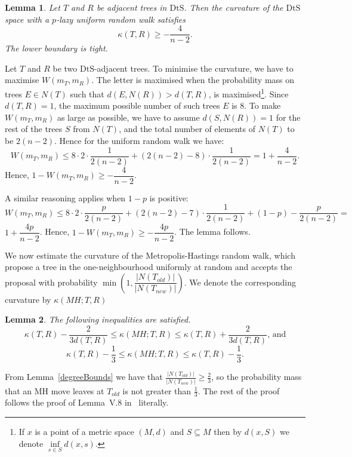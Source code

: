 \documentclass{amsart}
\newtheorem{lemma}{Lemma}
\newcommand{\dts}{\mathrm{DtS}}
\begin{document}
\begin{lemma}\label{uniformLower}
Let $T$ and $R$ be adjacent trees in $\dts$. Then the curvature of the $\dts$
space with a $p$-lazy uniform random walk satisfies
\[
\kappa(T,R) \geq -\frac{4}{n-2}.
\]
The lower boundary is tight. 
\end{lemma}

\proof
Let $T$ and $R$ be two $\dts$-adjacent trees. To minimise the curvature, we have
to maximise $W(m_T, m_R)$. The letter is maximised when the probability mass
on trees $E\in N(T)$ such that $d(E, N(R)) > d(T, R)$, is 
maximised\footnote{If $x$ is a point of a metric space $(M,d)$ and 
$S \subseteq M$ then by $d(x,S)$ we denote $\inf\limits_{s \in S} d(x,s)$.}. 
Since $d(T, R) = 1$, the maximum possible number of such trees $E$ is 
$8$. To make $W(m_T,m_R)$ as large as possible, we have to assume 
$d(S, N(R)) = 1$ for the rest of the trees $S$ from $N(T)$, and the
total number of elements of $N(T)$ to be $2(n-2)$.
Hence for the uniform random walk we have: 
\[
W(m_T,m_R)\leq 8 \cdot 2 \cdot \frac{1}{2(n - 2)} +
(2(n - 2) - 8) \cdot \frac{1}{2(n-2)} = 1 + \dfrac{4}{n-2}.
\]
Hence, $1 - W(m_T,m_R) \geq - \dfrac{4}{n-2}$. 

A similar reasoning applies when $1-p$ is positive:
\[
W(m_T,m_R)\leq 8 \cdot 2 \cdot \frac{p}{2(n - 2)} + 
(2(n - 2) - 7) \cdot \frac{1}{2(n-2)} + (1-p) - \frac{p}{2(n-2)} =
\]
$1 + \dfrac{4p}{n-2}$. Hence, 
$1 - W(m_T,m_R) \geq - \dfrac{4p}{n-2}$. The lemma follows. 
\endproof

We now estimate the curvature of the Metropolis-Hastings random walk, which 
propose a tree in the one-neighbourhood uniformly at random and 
accepts the proposal with probability 
$\min(1, \dfrac{|N(T_{old})|}{|N(T_{new})|})$. We denote the corresponding 
curvature by $\kappa(MH;T,R)$

\begin{lemma}
The following inequalities are satisfied. 
\[
\kappa(T,R) - \dfrac{2}{3d(T,R)} \leq \kappa(MH;T,R) \leq \kappa(T,R) +
\dfrac{2}{3d(T,R)}\mbox{, and}
\]
\[
\kappa(T,R) - \dfrac13 \leq \kappa(MH;T,R) \leq \kappa(T,R) - \dfrac13.
\]
\end{lemma}

\proof
From Lemma~\ref{degreeBounds} we have that 
$\frac{|N(T_{old})|}{|N(T_{new})|} \geq \frac{2}{3}$, so the probability 
mass that an MH move leaves at $T_{old}$ is not greater than $\frac13$. 
The rest of the
proof follows the proof of Lemma~V.8 in~\cite{Whidden2015-es} literally. 
\endproof
\end{document}
